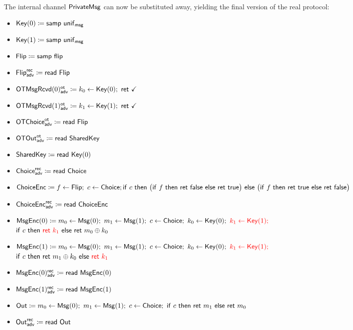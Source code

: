 \noindent The internal channel $\mathsf{PrivateMsg}$ can now be substituted away, yielding the final version of the real protocol:

\begin{itemize}
\item $\mathsf{Key}(0) \coloneqq \mathsf{samp} \ \mathsf{unif}_{\mathsf{msg}}$
\item $\mathsf{Key}(1) \coloneqq \mathsf{samp} \ \mathsf{unif}_{\mathsf{msg}}$
\item $\mathsf{Flip} \coloneqq \mathsf{samp} \ \mathsf{flip}$
\item {\color{blue} $\mathsf{Flip}^{\mathsf{rec}}_{\mathsf{adv}} \coloneqq \mathsf{read} \ \mathsf{Flip}$}
\item {\color{blue} $\LeakOTMsgRcvd(0)^\ot_\adv \coloneqq k_0 \leftarrow \Key(0); \ \ret{\checkmark}$}
\item {\color{blue} $\LeakOTMsgRcvd(1)^\ot_\adv \coloneqq k_1 \leftarrow \Key(1); \ \ret{\checkmark}$}
\item {\color{blue} $\mathsf{OTChoice}^{\mathsf{ot}}_{\mathsf{adv}} \coloneqq \mathsf{read} \ \mathsf{Flip}$}
\item {\color{blue} $\mathsf{OTOut}^{\mathsf{ot}}_{\mathsf{adv}} \coloneqq \mathsf{read} \ \mathsf{SharedKey}$}
\item $\mathsf{SharedKey} \coloneqq \mathsf{read} \ \mathsf{Key}(0)$
\item {\color{blue} $\mathsf{Choice}^{\mathsf{rec}}_{\mathsf{adv}} \coloneqq \mathsf{read} \ \mathsf{Choice}$}
\item $\mathsf{ChoiceEnc} \coloneqq f \leftarrow \mathsf{Flip}; \ c \leftarrow \mathsf{Choice}; \\ \mathsf{if} \ c \ \mathsf{then} \ \big(\mathsf{if} \ f \ \mathsf{then} \ \mathsf{ret} \ \mathsf{false} \ \mathsf{else} \ \mathsf{ret} \ \mathsf{true}\big) \ \mathsf{else} \ \big(\mathsf{if} \ f \ \mathsf{then} \ \mathsf{ret} \ \mathsf{true} \ \mathsf{else} \ \mathsf{ret} \ \mathsf{false}\big)$
\item {\color{blue} $\mathsf{ChoiceEnc}^{\mathsf{rec}}_{\mathsf{adv}} \coloneqq \mathsf{read} \ \mathsf{ChoiceEnc}$}
\item $\mathsf{MsgEnc}(0) \coloneqq m_0 \leftarrow \mathsf{Msg}(0); \ m_1 \leftarrow \mathsf{Msg}(1); \ c \leftarrow \mathsf{Choice}; \ k_0 \leftarrow \mathsf{Key}(0); \ {\color{red} k_1 \leftarrow \mathsf{Key}(1);}$ \\ $\mathsf{if} \ c \ \mathsf{then} \ {\color{red} \mathsf{ret} \ k_1} \ \mathsf{else} \ \mathsf{ret} \ m_0 \oplus k_0$
\item $\mathsf{MsgEnc}(1) \coloneqq m_0 \leftarrow \mathsf{Msg}(0); \ m_1 \leftarrow \mathsf{Msg}(1); \ c \leftarrow \mathsf{Choice}; \ k_0 \leftarrow \mathsf{Key}(0); \ {\color{red} k_1 \leftarrow \mathsf{Key}(1);}$ \\ $\mathsf{if} \ c \ \mathsf{then} \ \mathsf{ret} \ m_1 \oplus k_0 \ \mathsf{else} \ {\color{red} \mathsf{ret} \ k_1}$
\item {\color{blue} $\mathsf{MsgEnc}(0)^{\mathsf{rec}}_{\mathsf{adv}} \coloneqq \mathsf{read} \ \mathsf{MsgEnc}(0)$}
\item {\color{blue} $\mathsf{MsgEnc}(1)^{\mathsf{rec}}_{\mathsf{adv}} \coloneqq \mathsf{read} \ \mathsf{MsgEnc}(1)$}
\item $\Out \coloneqq m_0 \leftarrow \Msg(0); \ m_1 \leftarrow \Msg(1); \ c \leftarrow \Choice; \ \ifte{c}{\ret{m_1}}{\ret{m_0}}$
\item {\color{blue} $\mathsf{Out}^{\mathsf{rec}}_{\mathsf{adv}} \coloneqq \mathsf{read} \ \mathsf{Out}$}
\end{itemize}

